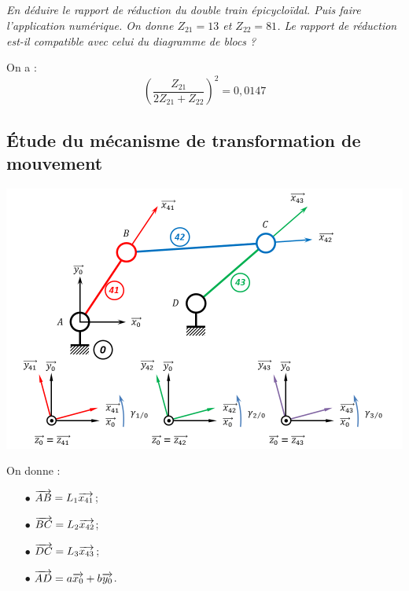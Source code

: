 \documentclass[10pt,fleqn]{article} %
\begin{document}
\begin{multicols}{2}
\subparagraph{}
\textit{En déduire le rapport de réduction du double train épicycloïdal. Puis faire l'application numérique. On donne $Z_{21}=13$ et $Z_{22}=81$. Le rapport de réduction est-il compatible avec celui du diagramme de blocs ?}

\ifprof
\begin{corrige}
On a : 
$$
\left(\dfrac{Z_{21}}{2 Z_{21}+Z_{22}}\right)^2=0,0147
$$
\end{corrige}
\else \fi

\subsection*{Étude du mécanisme de transformation de mouvement}

\begin{center}
\includegraphics[width=\linewidth]{images/A6_3barres}
\end{center}

On donne : 

\begin{minipage}[c]{.45\linewidth}
\begin{itemize}
\item [$\bullet$] $\overrightarrow{AB}=L_1\overrightarrow{x_{41}}$;
\item [$\bullet$] $\overrightarrow{BC}=L_2\overrightarrow{x_{42}}$;
\end{itemize}
\end{minipage}\hfill
\begin{minipage}[c]{.45\linewidth}
\begin{itemize}
\item [$\bullet$] $\overrightarrow{DC}=L_3\overrightarrow{x_{43}}$;
\item [$\bullet$] $\overrightarrow{AD}=a\overrightarrow{x_{0}}+b\overrightarrow{y_{0}}$.
\end{itemize}
\end{minipage}


\end{multicols}
\end{document}
